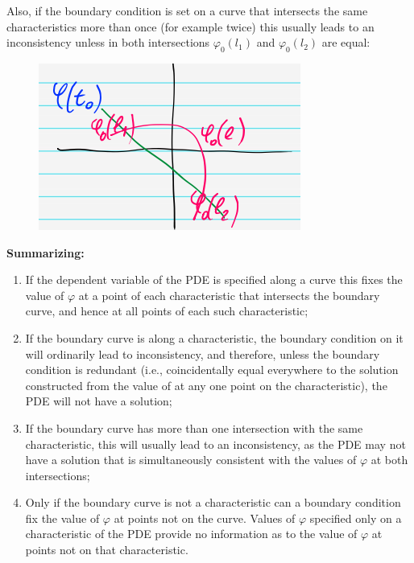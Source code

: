 \documentclass{article}
\begin{document}
\vspace{2mm}\noindent
Also, if the boundary condition is set on a curve that intersects the same characteristics more than once (for example twice) this usually leads to an inconsistency unless in both intersections $\varphi_0 (l_1)$ and $\varphi_0 (l_2)$ are equal:

\begin{figure}[h]
    \centering
    \includegraphics[width=0.4\linewidth]{fig55.png}
\end{figure}

\newpage
\noindent
\textbf{Summarizing:}
\begin{enumerate}
    \item If the dependent variable of the PDE is specified along a curve this fixes the value of $\varphi$ at a point of each characteristic that intersects the boundary curve, and hence at all points of each such characteristic;
    \item If the boundary curve is along a characteristic, the boundary condition on it will ordinarily lead to inconsistency, and therefore, unless the boundary condition is redundant (i.e., coincidentally equal everywhere to the solution constructed from the value of at any one point on the characteristic), the PDE will not have a solution;
    \item If the boundary curve has more than one intersection with the same characteristic, this will usually lead to an inconsistency, as the PDE may not have a solution that is simultaneously consistent with the values of $\varphi$ at both intersections; 
    \item Only if the boundary curve is not a characteristic can a boundary condition fix the value of $\varphi$ at points not on the curve. Values of $\varphi$ specified only on a characteristic of the PDE provide no information as to the value of $\varphi$ at points not on that characteristic.
\end{enumerate}
\end{document}
